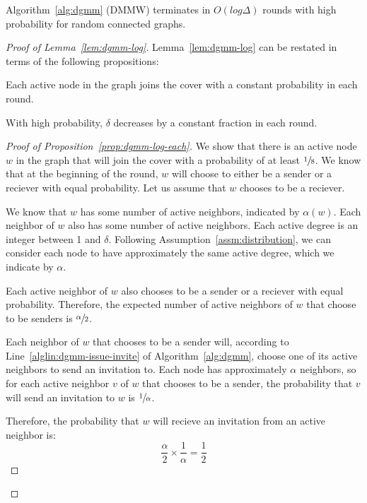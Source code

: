 \begin{lem}
\label{lem:dgmm-log}
Algorithm~\ref{alg:dgmm} (DMMW) terminates in $O(log \Delta)$ rounds with high probability for random connected graphs.
\end{lem}


\begin{proof}[Proof of Lemma~\ref{lem:dgmm-log}]


Lemma~\ref{lem:dgmm-log} can be restated in terms of the following propositions:
\begin{lprp}
\label{prop:dgmm-log-each}
Each active node in the graph joins the cover with a constant probability in each round.
\end{lprp}
\begin{lprp}
\label{prop:dgmm-log-alpha}
With high probability, $\delta$ decreases by a constant fraction in each round.
\end{lprp}
\begin{proof}[Proof of Proposition~\ref{prop:dgmm-log-each}]
We show that there is an active node $w$ in the graph that will join the cover with a probability of at least $\sfrac{1}{8}$. We know that at the beginning of the round, $w$ will choose to either be a sender or a reciever with equal probability. Let us assume that $w$ chooses to be a reciever.

We know that $w$ has some number of active neighbors, indicated by $\alpha(w)$. Each neighbor of $w$ also has some number of active neighbors. Each active degree is an integer between 1 and $\delta$. Following Assumption~\ref{assm:distribution}, we can consider each node to have approximately the same active degree, which we indicate by $\alpha$. 

Each active neighbor of $w$ also chooses to be a sender or a reciever with equal probability. Therefore, the expected number of active neighbors of $w$ that choose to be senders is $\sfrac{\alpha}{2}$. 

Each neighbor of $w$ that chooses to be a sender will, according to Line~\ref{alglin:dgmm-issue-invite} of Algorithm~\ref{alg:dgmm}, choose one of its active neighbors to send an invitation to. Each node has approximately $\alpha$ neighbors, so for each active neighbor $v$ of $w$ that chooses to be a sender, the probability that $v$ will send an invitation to $w$ is $\sfrac{1}{\alpha}$.

Therefore, the probability that $w$ will recieve an invitation from an active neighbor is: \begin{equation*}\frac{\alpha}{2} \times \frac{1}{\alpha} = \frac{1}{2}\end{equation*}


\end{proof}
\end{proof}
